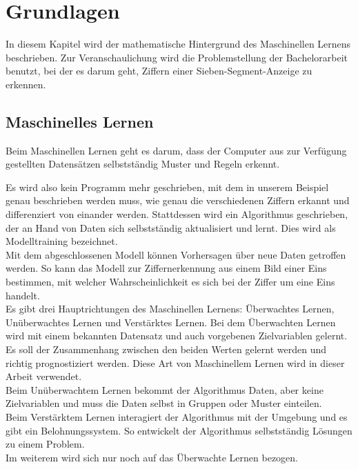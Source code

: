 \section{Grundlagen}
In diesem Kapitel wird der mathematische Hintergrund des Maschinellen Lernens beschrieben.
Zur Veranschaulichung wird die Problemstellung der Bachelorarbeit benutzt, bei der es darum geht, Ziffern einer Sieben-Segment-Anzeige zu erkennen.

\subsection{Maschinelles Lernen}
Beim Maschinellen Lernen geht es darum, dass der Computer aus  zur Verfügung gestellten Datensätzen selbstständig Muster und Regeln erkennt. \cite{Matzka_2021}

Es wird also kein Programm mehr geschrieben,  mit dem in unserem Beispiel genau beschrieben werden muss,  wie genau die verschiedenen Ziffern erkannt und differenziert von einander werden.
Stattdessen wird ein Algorithmus geschrieben, der an Hand von Daten sich selbstständig aktualisiert und lernt. Dies wird als Modelltraining bezeichnet.\\
Mit dem abgeschlossenen Modell können Vorhersagen über neue Daten getroffen werden.  So kann das Modell zur Ziffernerkennung aus einem Bild einer Eins bestimmen,  mit welcher Wahrscheinlichkeit es sich bei der Ziffer um eine Eins handelt.\\
Es gibt drei Hauptrichtungen des Maschinellen Lernens: Überwachtes Lernen,  Unüberwachtes Lernen und Verstärktes Lernen.
Bei dem Überwachten Lernen wird mit einem bekannten Datensatz und auch vorgebenen Zielvariablen gelernt.  Es soll der Zusammenhang zwischen den beiden Werten  gelernt werden und richtig prognostiziert werden.  Diese Art von Maschinellem Lernen wird in dieser Arbeit verwendet.\\
Beim Unüberwachtem Lernen bekommt der Algorithmus Daten, aber keine Zielvariablen und muss die Daten selbst in Gruppen oder Muster einteilen.\\
Beim Verstärktem Lernen interagiert der Algorithmus mit der Umgebung und es gibt ein Belohnungssystem.  So entwickelt der Algorithmus selbstständig Lösungen zu einem Problem.\cite{url:datasolut.com-20210901}\\
Im weiterem wird sich nur noch auf das Überwachte Lernen bezogen.

